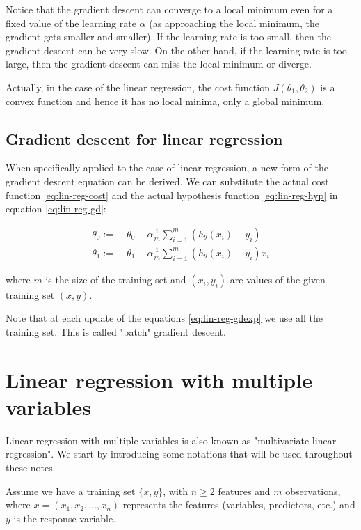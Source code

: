 \documentclass[a4paper,11pt]{report}
\begin{document}
Notice that the gradient descent can converge to a local minimum even for a fixed value of the learning rate $\alpha$ (as approaching the local minimum, the gradient gets smaller and smaller).
If the learning rate is too small, then the gradient descent can be very slow. On the other hand, if the learning rate is too large, then the gradient descent can miss the local minimum or diverge.

Actually, in the case of the linear regression, the cost function $J(\theta_1, \theta_2)$ is a convex function and hence it has no local minima, only a global minimum.

\subsection*{Gradient descent for linear regression}

When specifically applied to the case of linear regression, a new form of the gradient descent equation can be derived. We can substitute the actual cost function \eqref{eq:lin-reg-cost}
and the actual hypothesis function \eqref{eq:lin-reg-hyp} in equation \eqref{eq:lin-reg-gd}:

\begin{equation}\label{eq:lin-reg-gdexp}
\begin{split}
  \theta_0 := & \;\theta_0 - \alpha \frac{1}{m} \sum\limits_{i=1}^{m}(h_\theta(x_{i}) - y_{i}) \\
  \theta_1 := & \;\theta_1 - \alpha \frac{1}{m} \sum\limits_{i=1}^{m}(h_\theta(x_{i}) - y_{i}) x_{i}
\end{split}
\end{equation}

where $m$ is the size of the training set and $(x_{i}, y_{i})$ are values of the given training set $(x, y)$.

Note that at each update of the equations \eqref{eq:lin-reg-gdexp} we use all the training set. This is called "batch" gradient descent.



\section{Linear regression with multiple variables}\label{sec:mul-reg}

Linear regression with multiple variables is also known as "multivariate linear regression".
We start by introducing some notations that will be used throughout these notes.

Assume we have a training set $\{x, y\}$, with $n \geq 2$ features and $m$ observations, where \newline
$x = (x_1, x_2, \ldots, x_n)$ represents the features (variables, predictors, etc.) and $y $ is the response variable.
\end{document}
